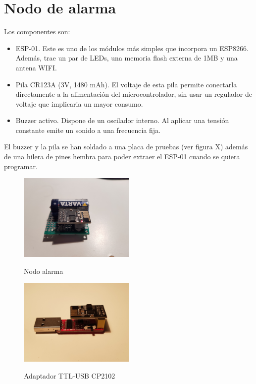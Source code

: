 \documentclass{article}
\begin{document}
\section{Nodo de alarma}
Los componentes son: 
\begin{itemize}
	\item ESP-01. Este es uno de los módulos más simples que incorpora un ESP8266. Además, trae un par de LEDs, una memoria flash externa de 1MB y una antena WIFI.
	\item Pila CR123A (3V, 1480 mAh). El voltaje de esta pila permite conectarla directamente a la alimentación del microcontrolador, sin usar un regulador de voltaje que implicaria un mayor consumo. 
	\item Buzzer activo. Dispone de un oscilador interno. Al aplicar una tensión constante emite un sonido a una frecuencia fija.  
\end{itemize}
El buzzer y la pila se han soldado a una placa de pruebas (ver figura X) además de una hilera de pines hembra para poder extraer el ESP-01 cuando se quiera programar.

\begin{figure}
\center
\includegraphics[width=0.5\textwidth]{imagenes/alarma.jpg}
\label{fig:alarma}
\caption{Nodo alarma}
\end{figure}

\begin{figure}
\center
\includegraphics[width=0.5\textwidth]{imagenes/programador.jpg}
\label{fig:programador}
\caption{Adaptador TTL-USB CP2102}
\end{figure}
\end{document}
